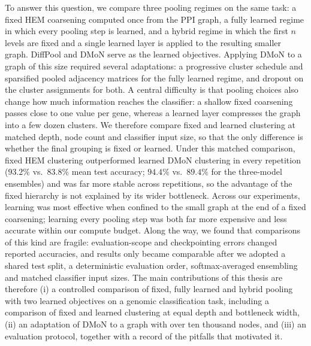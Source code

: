 To answer this question, we compare three pooling regimes on the same task: a fixed HEM coarsening computed once from the PPI graph, a fully learned regime in which every pooling step is learned, and a hybrid regime in which the first $n$ levels are fixed and a single learned layer is applied to the resulting smaller graph. DiffPool and DMoN serve as the learned objectives. Applying DMoN to a graph of this size required several adaptations: a progressive cluster schedule and sparsified pooled adjacency matrices for the fully learned regime, and dropout on the cluster assignments for both. A central difficulty is that pooling choices also change how much information reaches the classifier: a shallow fixed coarsening passes close to one value per gene, whereas a learned layer compresses the graph into a few dozen clusters. We therefore compare fixed and learned clustering at matched depth, node count and classifier input size, so that the only difference is whether the final grouping is fixed or learned. Under this matched comparison, fixed HEM clustering outperformed learned DMoN clustering in every repetition ($93.2\%$ vs.\ $83.8\%$ mean test accuracy; $94.4\%$ vs.\ $89.4\%$ for the three-model ensembles) and was far more stable across repetitions, so the advantage of the fixed hierarchy is not explained by its wider bottleneck. Across our experiments, learning was most effective when confined to the small graph at the end of a fixed coarsening; learning every pooling step was both far more expensive and less accurate within our compute budget. Along the way, we found that comparisons of this kind are fragile: evaluation-scope and checkpointing errors changed reported accuracies, and results only became comparable after we adopted a shared test split, a deterministic evaluation order, softmax-averaged ensembling and matched classifier input sizes. The main contributions of this thesis are therefore (i) a controlled comparison of fixed, fully learned and hybrid pooling with two learned objectives on a genomic classification task, including a comparison of fixed and learned clustering at equal depth and bottleneck width, (ii) an adaptation of DMoN to a graph with over ten thousand nodes, and (iii) an evaluation protocol, together with a record of the pitfalls that motivated it.
